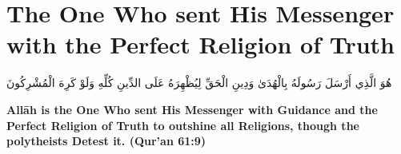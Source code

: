 \chapter{The One Who sent His Messenger with the Perfect Religion of Truth}
\begin{center}
    {\Huge    
        \begin{Arabic}
            هُوَ الَّذِي أَرْسَلَ رَسُولَهُ بِالْهُدَىٰ وَدِينِ الْحَقِّ لِيُظْهِرَهُ عَلَى الدِّينِ كُلِّهِ وَلَوْ كَرِهَ الْمُشْرِكُونَ
        \end{Arabic}
    }
\end{center}
\vspace*{\fill}
\vspace{3cm}
\begin{center}
    \large \textbf{Allāh is the One Who sent His Messenger with Guidance and the Perfect Religion of Truth to outshine all Religions, though the polytheists Detest it. (Qur'an 61:9)}
\end{center}
